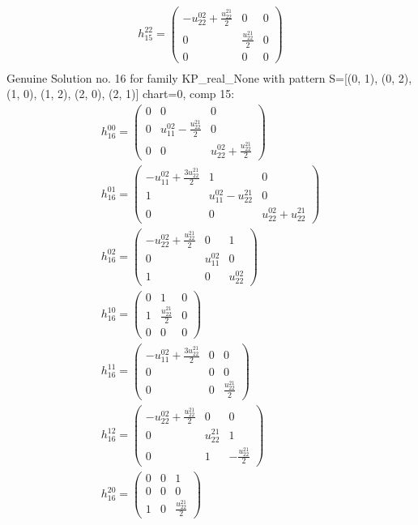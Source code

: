 \documentclass[a4paper, 11pt, twoside, onecolumn]{article}
\begin{document}
\begin{landscape}
\begin{gather*}
	 h_{15}^{22}=\begin{pmatrix}- u^{02}_{22} + \frac{u^{21}_{22}}{2} & 0 & 0\\0 & \frac{u^{21}_{22}}{2} & 0\\0 & 0 & 0\end{pmatrix}\\ 
\end{gather*} 
Genuine Solution no. 16 for family KP_real_None with pattern S=[(0, 1), (0, 2), (1, 0), (1, 2), (2, 0), (2, 1)] chart=0, comp 15: 
\begin{gather*} 
	 h_{16}^{00}=\begin{pmatrix}0 & 0 & 0\\0 & u^{02}_{11} - \frac{u^{21}_{22}}{2} & 0\\0 & 0 & u^{02}_{22} + \frac{u^{21}_{22}}{2}\end{pmatrix}\\ 
	 h_{16}^{01}=\begin{pmatrix}- u^{02}_{11} + \frac{3 u^{21}_{22}}{2} & 1 & 0\\1 & u^{02}_{11} - u^{21}_{22} & 0\\0 & 0 & u^{02}_{22} + u^{21}_{22}\end{pmatrix}\\ 
	 h_{16}^{02}=\begin{pmatrix}- u^{02}_{22} + \frac{u^{21}_{22}}{2} & 0 & 1\\0 & u^{02}_{11} & 0\\1 & 0 & u^{02}_{22}\end{pmatrix}\\ 
	 h_{16}^{10}=\begin{pmatrix}0 & 1 & 0\\1 & \frac{u^{21}_{22}}{2} & 0\\0 & 0 & 0\end{pmatrix}\\ 
	 h_{16}^{11}=\begin{pmatrix}- u^{02}_{11} + \frac{3 u^{21}_{22}}{2} & 0 & 0\\0 & 0 & 0\\0 & 0 & \frac{u^{21}_{22}}{2}\end{pmatrix}\\ 
	 h_{16}^{12}=\begin{pmatrix}- u^{02}_{22} + \frac{u^{21}_{22}}{2} & 0 & 0\\0 & u^{21}_{22} & 1\\0 & 1 & - \frac{u^{21}_{22}}{2}\end{pmatrix}\\ 
	 h_{16}^{20}=\begin{pmatrix}0 & 0 & 1\\0 & 0 & 0\\1 & 0 & \frac{u^{21}_{22}}{2}\end{pmatrix}\\ 

\end{gather*}
\end{landscape}
\end{document}
